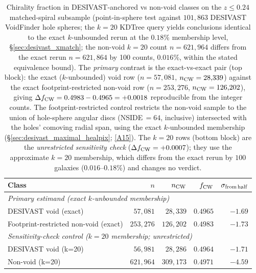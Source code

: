 \documentclass[aps,prd,twocolumn,superscriptaddress,showpacs,preprintnumbers,nofootinbib,longbibliography,floatfix]{revtex4-2}
\newcommand{\repoBase}{https://github.com/Hubify-Projects/bigbounce/blob/main}
\begin{document}
\begin{table}[ht]
\caption{Chirality fraction in DESIVAST-anchored vs non-void classes
on the $z \leq 0.24$ matched-spiral subsample (point-in-sphere test
against $101{,}863$ DESIVAST VoidFinder hole spheres; the $k=20$
KDTree query yields conclusions identical to the exact $k$-unbounded
rerun at the $0.18\%$ membership level, \S\ref{sec:desivast_xmatch};
the non-void $k\!=\!20$ count $n=621{,}964$ differs from the exact
rerun $n=621{,}864$ by 100 counts, $0.016\%$, within the stated
equivalence bound).
The \emph{primary} contrast is the exact-vs-exact pair (top block): the
exact ($k$-unbounded) void row ($n = 57{,}081$, $n_{\rm CW} = 28{,}339$)
against the exact footprint-restricted non-void row ($n = 253{,}276$,
$n_{\rm CW} = 126{,}202$), giving
$\Delta f_{\rm CW} = 0.4983 - 0.4965 = +0.0018$ reproducible from the
integer counts. The footprint-restricted control restricts the non-void
sample to the union of hole-sphere angular discs (NSIDE\,$=\!64$,
inclusive) intersected with the holes' comoving radial span, using the
exact $k$-unbounded membership
(\S\ref{sec:desivast_maximal_healpix};
\href{\repoBase/pipelines/p5\_desi\_chirality/outputs/29\_ext3\_desivast\_footprint\_retabulation.json}{[A15]}).
The $k=20$ rows (bottom block) are the \emph{unrestricted sensitivity
check} ($\Delta f_{\rm CW} = +0.0007$); they use the approximate $k=20$
membership, which differs from the exact rerun by $100$ galaxies
($0.016$--$0.18\%$) and changes no verdict.}
\label{tab:desivast_canonical}
\begin{ruledtabular}
\begin{tabular}{lrrrr}
Class & $n$ & $n_{\rm CW}$ & $f_{\rm CW}$ & $\sigma_{\rm from\,half}$ \\
\hline
\multicolumn{5}{l}{\textit{Primary estimand (exact $k$-unbounded membership)}} \\
DESIVAST void (exact) & $57{,}081$ & $28{,}339$ & $0.4965$ & $-1.69$ \\
Footprint-restricted non-void (exact) & $253{,}276$ & $126{,}202$ & $0.4983$ & $-1.73$ \\
\hline
\multicolumn{5}{l}{\textit{Sensitivity-check control ($k=20$ membership; unrestricted)}} \\
DESIVAST void (k=20) & $56{,}981$ & $28{,}286$ & $0.4964$ & $-1.71$ \\
Non-void (k=20)      & $621{,}964$ & $309{,}173$ & $0.4971$ & $-4.59$ \\
\end{tabular}
\end{ruledtabular}
\end{table}
\end{document}
